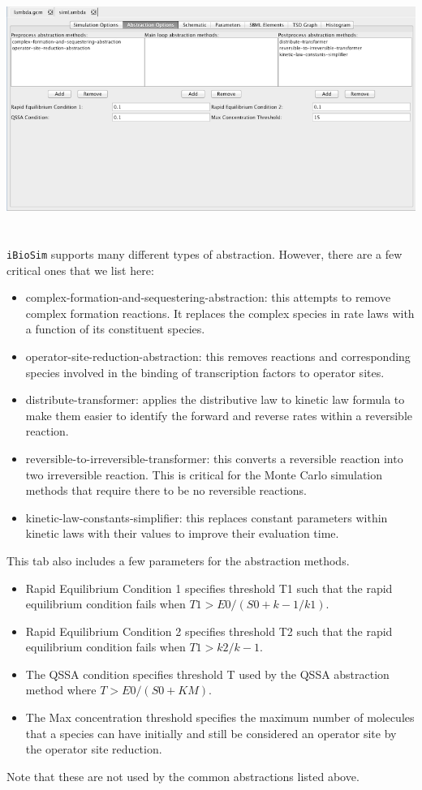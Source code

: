 \documentclass[titlepage,11pt]{article}
\begin{document}
\begin{center}
\includegraphics[height=80mm]{screenshots/absOptions}
\end{center}

{\tt iBioSim} supports many different types of abstraction.  However, there are a few critical ones that we list here:
\begin{itemize}
\item complex-formation-and-sequestering-abstraction: this attempts to remove complex formation reactions.  It replaces the complex species in rate laws with a function of its constituent species.
\item operator-site-reduction-abstraction: this removes reactions and corresponding species involved in the binding of transcription factors to operator sites.
\item distribute-transformer: applies the distributive law to kinetic law formula to make them easier to identify the forward and reverse rates within a reversible reaction.
\item reversible-to-irreversible-transformer: this converts a reversible reaction into two irreversible reaction.  This is critical for the Monte Carlo simulation methods that require there to be no reversible reactions.
\item kinetic-law-constants-simplifier: this replaces constant parameters within kinetic laws with their values to improve their evaluation time.
\end{itemize}

This tab also includes a few parameters for the abstraction methods.
\begin{itemize}
\item Rapid Equilibrium Condition 1 specifies threshold T1 such that the rapid equilibrium condition fails when $T1 > E0 / (S0 + k-1/k1)$.
\item Rapid Equilibrium Condition 2 specifies threshold T2 such that the rapid equilibrium condition fails when $T1 > k2 /k-1$.
\item The QSSA condition specifies threshold T used by the QSSA abstraction method where $T > E0 / (S0 + KM)$.
\item The Max concentration threshold specifies the maximum number of molecules that a species can have initially and still be considered an operator site by the operator site reduction. 
\end{itemize}
Note that these are not used by the common abstractions listed above.
\end{document}
